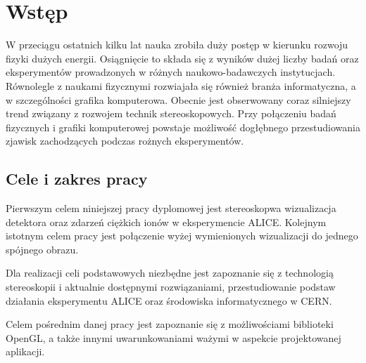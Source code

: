 
\graphicspath{{images/}}



\tableofcontents
\thispagestyle{empty}
\thesisstyle
\newpage 

\section[Wstęp]{Wstęp}
W przeciągu ostatnich kilku lat nauka zrobiła duży postęp w kierunku rozwoju fizyki dużych energii. Osiągnięcie to składa się z wyników dużej liczby badań oraz eksperymentów prowadzonych w różnych naukowo-badawczych instytucjach. Równolegle z naukami fizycznymi rozwiajała się również branża informatyczna, a w szczególności grafika komputerowa. Obecnie jest obserwowany coraz silniejszy trend związany z rozwojem technik stereoskopowych. Przy połączeniu badań fizycznych i grafiki komputerowej powstaje możliwość dogłębnego przestudiowania zjawisk zachodzących podczas rożnych eksperymentów. 

\subsection{Cele i zakres pracy}
Pierwszym celem niniejszej pracy dyplomowej jest stereoskopwa wizualizacja detektora oraz zdarzeń ciężkich ionów w eksperymencie ALICE. Kolejnym istotnym celem pracy jest połączenie wyżej wymienionych wizualizacji do jednego spójnego obrazu.

Dla realizacji celi podstawowych niezbędne jest zapoznanie się z technologią stereoskopii i aktualnie dostępnymi rozwiązaniami, przestudiowanie podstaw działania eksperymentu ALICE oraz środowiska informatycznego w CERN.

Celem pośrednim danej pracy jest zapoznanie się z możliwościami biblioteki OpenGL, a także innymi uwarunkowaniami ważymi w aspekcie projektowanej aplikacji.

